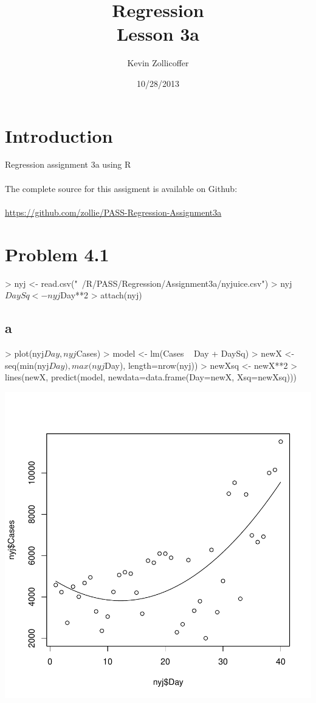 \documentclass{article}
\author{Kevin Zollicoffer}
\title{Regression\\Lesson 3a}
\date{10/28/2013}
\begin{document}
\maketitle


\section*{Introduction}
Regression assignment 3a using R
\\
\\
The complete source for this assigment is available on Github:
\\
\\
\url{https://github.com/zollie/PASS-Regression-Assignment3a}

\section*{Problem 4.1}
\begin{Schunk}
\begin{Sinput}
> nyj <- read.csv("~/R/PASS/Regression/Assignment3a/nyjuice.csv")
> nyj$DaySq <- nyj$Day**2
> attach(nyj)
\end{Sinput}
\end{Schunk}
\subsection*{a}
\begin{Schunk}
\begin{Sinput}
> plot(nyj$Day, nyj$Cases)
> model <- lm(Cases ~ Day + DaySq)
> newX <- seq(min(nyj$Day), max(nyj$Day), length=nrow(nyj))
> newXsq <- newX**2
> lines(newX, predict(model, newdata=data.frame(Day=newX, Xsq=newXsq)))
\end{Sinput}
\end{Schunk}
\includegraphics{Assignment3a-002}
\end{document}
